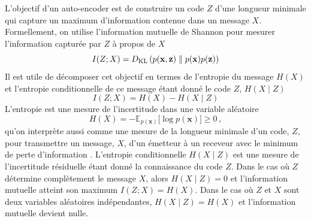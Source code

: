 L'objectif d'un auto-encoder est de construire un code $Z$ d'une longueur minimale qui capture un maximum d'information contenue dans un message $X$. 
Formellement, on utilise l'information mutuelle de Shannon pour mesurer l'information capturée par $Z$ à propos de $X$
\begin{equation}\label{eq:ShannonInfo}
        I(Z ; X) = D_{\mathrm{KL}}\left(p(\mathbf{x}, \mathbf{z}) \KL p(\mathbf{x}) p(\mathbf{z})\right) %
\end{equation} 
Il est utile de décomposer cet objectif en termes de l'entropie du message $H(X)$ et l'entropie 
conditionnelle de ce message étant donné le code $Z$, $H(X \mid Z)$
\begin{equation}\label{eq:info entropy}
       I(Z; X) = H(X) - H(X \mid Z) 
\end{equation} 
L'entropie est une mesure de l'incertitude dans une variable aléatoire
\begin{equation}\label{eq:entropy}
        H(X) = -\mathbb{E}_{p(\mathbf{x})}\big[\log p(\mathbf{x}) \big] \geq 0\, ,
\end{equation} 
qu'on interprète aussi comme une mesure de la longueur minimale d'un code, $Z$, pour 
transmettre un message, $X$, d'un émetteur à un receveur avec le minimum de perte d'information \citep{Shannon1948,Kolmogorov1965}.
L'entropie conditionnelle $H(X \mid Z)$ est une  mesure de l'incertitude résiduelle étant donné la connaissance du code $Z$. Dans le cas où $Z$ 
détermine complètement le message $X$, alors $H(X \mid Z) = 0$ et l'information mutuelle atteint son maximum $I(Z; X) = H(X)$.
Dans le cas où $Z$ et $X$ sont deux variables aléatoires indépendantes, $H(X \mid Z) = H(X)$ et l'information mutuelle devient nulle.


